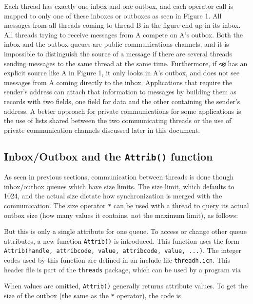Each thread has exactly one inbox and one outbox, and each operator call is
mapped to only one of these inboxes or outboxes as seen in Figure 1.  All
messages from all threads coming to thread B in the figure end up in its
inbox. All threads trying to receive messages from A compete on A's outbox. Both
the inbox and the outbox queues are public communications channels, and it is
impossible to distinguish the source of a message if there are several threads
sending messages to the same thread at the same time. Furthermore, if
\texttt{{<}@} has an explicit source like A in Figure 1, it only looks in A's
outbox, and does not see messages from A coming directly to the
inbox. Applications that require the sender's address can attach that
information to messages by building them as records with two fields, one field
for data and the other containing the sender's address. A better approach for
private communications for some applications is the use of lists shared between
the two communicating threads or the use of private communication channels
discussed later in this document.


\subsection{Inbox/Outbox and the \texttt{Attrib()} function}

As seen in previous sections, communication between threads is done though
inbox/outbox queues which have size limits. The size limit, which defaults to
1024, and the actual size dictate how synchronization is merged with the
communication. The size operator \texttt{*} can be used with a thread to query
its actual outbox size (how many values it contains, not the maximum limit), as
follows:


But this is only a single attribute for one queue.  To access or change other
queue attributes, a new function \texttt{Attrib()} is introduced.  This function
uses the form \texttt{Attrib(handle, attribcode, value, attribcode, value,
  ...)}. The integer codes used by this function are defined in an include file
\texttt{threadh.icn}. This header file is part of the \texttt{threads} package,
which can be used by a program via


When values are omitted, \texttt{Attrib()} generally returns attribute
values. To get the size of the outbox (the same as the \texttt{*} operator), the
code is

